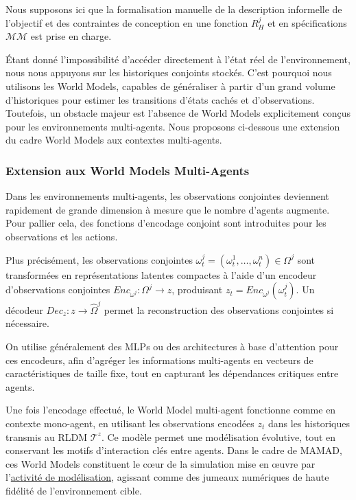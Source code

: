 Nous supposons ici que la formalisation manuelle de la description informelle de l'objectif et des contraintes de conception en une fonction $R^j_H$ et en spécifications $\mathcal{MM}$ est prise en charge.

Étant donné l'impossibilité d'accéder directement à l'état réel de l'environnement, nous nous appuyons sur les historiques conjoints stockés. C'est pourquoi nous utilisons les World Models, capables de généraliser à partir d'un grand volume d'historiques pour estimer les transitions d'états cachés et d'observations. Toutefois, un obstacle majeur est l'absence de World Models explicitement conçus pour les environnements multi-agents. Nous proposons ci-dessous une extension du cadre World Models aux contextes multi-agents.

\subsubsection*{Extension aux World Models Multi-Agents}

Dans les environnements multi-agents, les observations conjointes deviennent rapidement de grande dimension à mesure que le nombre d'agents augmente. Pour pallier cela, des fonctions d'encodage conjoint sont introduites pour les observations et les actions.

Plus précisément, les observations conjointes $\omega_t^{j} = (\omega_t^1, \dots, \omega_t^n) \in \Omega^{j}$ sont transformées en représentations latentes compactes à l'aide d'un encodeur d'observations conjointes $Enc_{\omega^j} : \Omega^j \rightarrow z$, produisant $z_t = Enc_{\omega^j}(\omega_t^j)$. Un décodeur $Dec_z : z \rightarrow \hat{\Omega}^j$ permet la reconstruction des observations conjointes si nécessaire.

On utilise généralement des \ac{MLP}s ou des architectures à base d'attention pour ces encodeurs, afin d'agréger les informations multi-agents en vecteurs de caractéristiques de taille fixe, tout en capturant les dépendances critiques entre agents.

Une fois l'encodage effectué, le World Model multi-agent fonctionne comme en contexte mono-agent, en utilisant les observations encodées $z_t$ dans les historiques transmis au \ac{RLDM} $\mathcal{T}^{z}$. Ce modèle permet une modélisation évolutive, tout en conservant les motifs d'interaction clés entre agents. Dans le cadre de \ac{MAMAD}, ces World Models constituent le cœur de la simulation mise en œuvre par l'\hyperref[sec:modelling]{activité de modélisation}, agissant comme des jumeaux numériques de haute fidélité de l'environnement cible.

